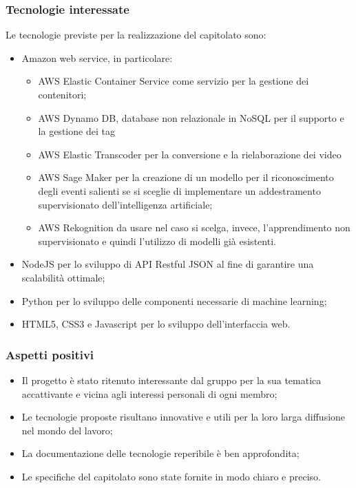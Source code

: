 \subsubsection{Tecnologie interessate}
Le tecnologie previste per la realizzazione del capitolato sono:
\begin{itemize}
	\item Amazon web service, in particolare:
	\begin{itemize}
		\item AWS Elastic Container Service come servizio per la gestione dei contenitori;
		\item AWS Dynamo DB, database non relazionale in NoSQL per il supporto e la gestione dei tag
		\item AWS Elastic Transcoder per la conversione e la rielaborazione dei video
		\item AWS Sage Maker per la creazione di un modello per il riconoscimento degli eventi salienti se si sceglie di implementare un addestramento supervisionato dell'intelligenza artificiale;
		\item AWS Rekognition da usare nel caso si scelga, invece, l'apprendimento non supervisionato e quindi l'utilizzo di modelli già esistenti.
	\end{itemize}
	\item NodeJS per lo sviluppo di API Restful JSON al fine di garantire una scalabilità ottimale;
	\item Python per lo sviluppo delle componenti necessarie di machine learning;
	\item HTML5, CSS3 e Javascript per lo sviluppo dell'interfaccia web. 
\end{itemize}
\subsubsection{Aspetti positivi}
\begin{itemize}
	\item Il progetto è stato ritenuto interessante dal gruppo per la sua tematica accattivante e vicina agli interessi personali di ogni membro;
	\item Le tecnologie proposte risultano innovative e utili per la loro larga diffusione nel mondo del lavoro;
	\item La documentazione delle tecnologie reperibile è ben approfondita;
	\item Le specifiche del capitolato sono state fornite in modo chiaro e preciso. 
\end{itemize}
